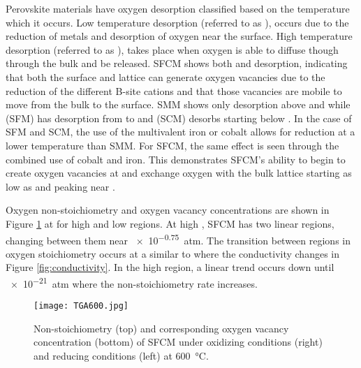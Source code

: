     Perovskite materials have oxygen desorption classified based on the temperature which it occurs.
    Low temperature desorption (referred to as \textalpha), occurs due to the reduction of metals and desorption of oxygen near the surface.
    High temperature desorption (referred to as \textbeta), takes place when oxygen is able to diffuse though through the bulk and be released.\cite{Levasseur2009}
    SFCM shows both \textalpha{} and \textbeta{} desorption, indicating that both the surface and lattice can generate oxygen vacancies due to the reduction of the different B-site cations and that those vacancies are mobile to move from the bulk to the surface.
    SMM shows only \textbeta{} desorption above  and while  (SFM) has \textalpha{} desorption from  to  and  (SCM) desorbs starting below .\cite{Liu2011, Vasala2010}
    In the case of SFM and SCM, the use of the multivalent iron or cobalt allows for reduction at a lower temperature than SMM.
    For SFCM, the same effect is seen through the combined use of cobalt and iron.
    This demonstrates SFCM's ability to begin to create oxygen vacancies at  and exchange oxygen with the bulk lattice starting as low as  and peaking near .

    Oxygen non-stoichiometry and oxygen vacancy concentrations are shown in Figure \ref{fig:TGA600} at  for high and low  regions.
    At high , SFCM has two linear regions, changing between them near \SI{e-0.75}{atm}.
    The transition between regions in oxygen stoichiometry occurs at a similar  to where the conductivity changes in Figure \ref{fig:conductivity}.
    In the high  region, a linear trend occurs down until \SI{e-21}{atm} where the non-stoichiometry rate increases.

    \begin{figure}
      \texttt{[image: TGA600.jpg]}
      \caption{Non-stoichiometry (top) and corresponding oxygen vacancy concentration (bottom) of SFCM under oxidizing conditions (right) and reducing conditions (left) at \SI{600}{\celsius}.}
      \label{fig:TGA600}
    \end{figure}


